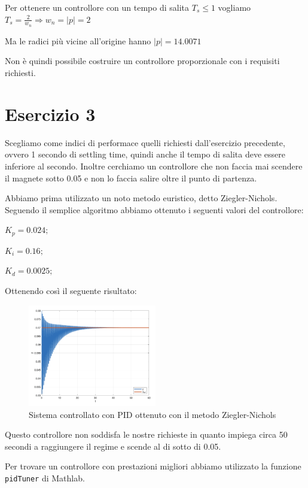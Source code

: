 \documentclass{article}
\newcommand{\spacer}[1][8pt]{
    \par\vspace{#1}
}
\begin{document}
Per ottenere un controllore con un tempo di salita $T_s \le 1$ vogliamo $T_s = \frac{2}{w_n} \Rightarrow w_n = |p| = 2$

Ma le radici più vicine all'origine hanno $|p| = 14.0071$

Non è quindi possibile costruire un controllore proporzionale con i requisiti richiesti.

\section{Esercizio 3}
Scegliamo come indici di performace quelli richiesti dall'esercizio precedente, ovvero 1 secondo di settling time, quindi anche il tempo di salita deve essere inferiore al secondo.
Inoltre cerchiamo un controllore che non faccia mai scendere il magnete sotto 0.05 e non lo faccia salire oltre il punto di partenza.

\spacer
Abbiamo prima utilizzato un noto metodo euristico, detto Ziegler-Nichols. Seguendo il semplice algoritmo abbiamo ottenuto i seguenti valori del controllore:

$K_p = 0.024;$

$K_i = 0.16;$

$K_d = 0.0025;$

\spacer
Ottenendo così il seguente risultato:

\begin{figure}[H]
    \centering
    \includegraphics[width = 0.5\textwidth]{Images/PID-euristico.png}
    \caption{Sistema controllato con PID ottenuto con il metodo Ziegler-Nichols}
    \label{fig:Ziegler_Nichols_PID}
\end{figure}

Questo controllore non soddisfa le nostre richieste in quanto impiega circa 50 secondi a raggiungere il regime e scende al di sotto di 0.05.

\spacer
Per trovare un controllore con prestazioni migliori abbiamo utilizzato la funzione \texttt{pidTuner} di Mathlab.
\end{document}
